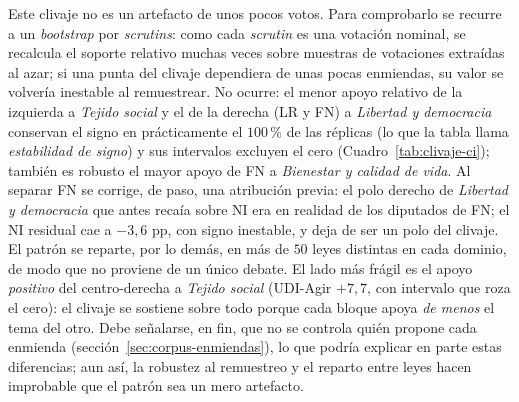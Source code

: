 Este clivaje no es un artefacto de unos pocos votos. Para comprobarlo se recurre a
un \emph{bootstrap} por \emph{scrutins}: como cada \emph{scrutin} es una votación
nominal, se recalcula el soporte relativo muchas veces sobre muestras de
votaciones extraídas al azar; si una punta del clivaje dependiera de unas pocas
enmiendas, su valor se volvería inestable al remuestrear. No ocurre: el menor
apoyo relativo de la izquierda a \emph{Tejido social} y el de la derecha
(LR y FN) a \emph{Libertad y democracia} conservan el signo en prácticamente el
$100\,\%$ de las réplicas (lo que la tabla llama \emph{estabilidad de signo}) y
sus intervalos excluyen el cero (Cuadro~\ref{tab:clivaje-ci}); también es robusto el mayor apoyo de FN a
\emph{Bienestar y calidad de vida}. Al separar FN se corrige, de paso, una atribución previa:
el polo derecho de \emph{Libertad y democracia} que antes recaía sobre NI era en
realidad de los diputados de FN; el NI residual cae a $-3{,}6$ pp, con signo
inestable, y deja de ser un polo del clivaje. El patrón se reparte, por lo demás,
en más de $50$ leyes distintas en cada dominio, de modo que no proviene de un
único debate. El lado más frágil es el apoyo \emph{positivo} del centro-derecha a
\emph{Tejido social} (UDI-Agir $+7{,}7$, con intervalo que roza el cero): el
clivaje se sostiene sobre todo porque cada bloque apoya \emph{de menos} el tema
del otro. Debe señalarse, en fin, que no se controla quién propone cada enmienda
(sección~\ref{sec:corpus-enmiendas}), lo que podría explicar en parte estas
diferencias; aun así, la robustez al remuestreo y el reparto entre leyes hacen
improbable que el patrón sea un mero artefacto.

